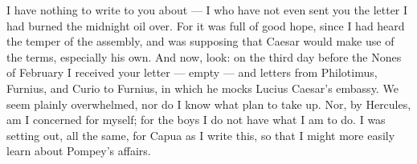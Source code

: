 

 I have nothing to write to you about --- I who have not even sent you the letter I had burned the midnight oil over. For it was full of good hope, since I had heard the temper of the assembly, and was supposing that Caesar would make use of the terms, especially his own. And now, look: on the third day before the Nones of February I received your letter --- empty --- and letters from Philotimus, Furnius, and Curio to Furnius, in which he mocks Lucius Caesar's embassy. We seem plainly overwhelmed, nor do I know what plan to take up. Nor, by Hercules, am I concerned for myself; for the boys I do not have what I am to do. I was setting out, all the same, for Capua as I write this, so that I might more easily learn about Pompey's affairs.
